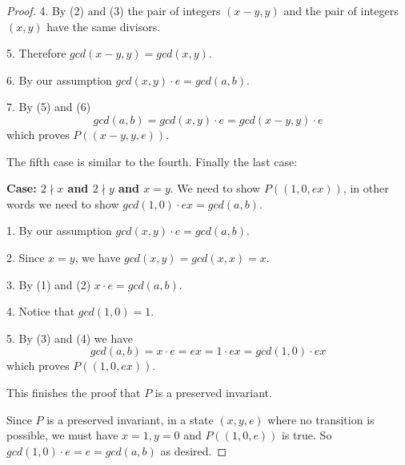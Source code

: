 \documentclass[14pt]{extarticle}
\begin{document}
\begin{proof}
4. By (2) and (3) the pair of integers $(x - y, y)$ and the pair of integers $(x, y)$ have the same divisors.

5. Therefore $gcd(x-y,y) = gcd(x,y)$.

6. By our assumption $gcd(x,y) \cdot e = gcd(a,b)$.

7. By (5) and (6)
$$
gcd(a,b) = gcd(x,y) \cdot e = gcd(x-y,y) \cdot e
$$
which proves $P((x-y, y, e))$.

The fifth case is similar to the fourth. Finally the last case:

{\bf Case: $2 \nmid x$ and $2 \nmid y$ and $x = y$}. We need to show $P((1, 0, ex))$, in other words we need to show $gcd(1, 0) \cdot ex = gcd(a,b)$.

1. By our assumption $gcd(x,y) \cdot e = gcd(a,b)$.

2. Since $x = y$, we have $gcd(x, y) = gcd(x, x) = x$.

3. By (1) and (2) $x \cdot e = gcd(a,b)$.

4. Notice that $gcd(1, 0) = 1$.

5. By (3) and (4) we have
$$
gcd(a,b) = x \cdot e = ex = 1 \cdot ex = gcd(1,0) \cdot ex
$$
which proves $P((1,0,ex))$.

This finishes the proof that $P$ is a preserved invariant.

Since $P$ is a preserved invariant, in a state $(x,y,e)$ where no transition is possible, we must have $x = 1, y = 0$ and $P((1,0,e))$ is true. So $gcd(1,0) \cdot e = e = gcd(a,b)$ as desired.
\end{proof}
\end{document}
